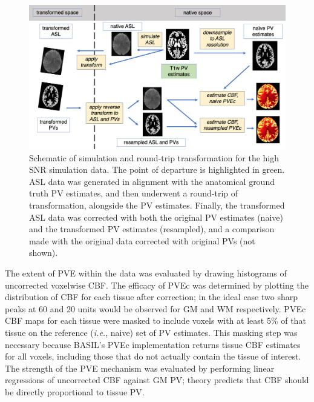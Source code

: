\documentclass[12pt]{report}
\begin{document}
\begin{figure}[h]
\centering
\includegraphics[width = \textwidth]{doublesim_schema.png}
\caption{Schematic of simulation and round-trip transformation for the high SNR simulation data. The point of departure is highlighted in green. ASL data was generated in alignment with the anatomical ground truth PV estimates, and then underwent a round-trip of transformation, alongside the PV estimates. Finally, the transformed ASL data was corrected with both the original PV estimates (naive) and the transformed PV estimates (resampled), and a comparison made with the original data corrected with original PVs (not shown).}
\label{doublesim_schema}
\end{figure}

The extent of PVE within the data was evaluated by drawing histograms of uncorrected voxelwise CBF. The efficacy of PVEc was determined by plotting the distribution of CBF for each tissue after correction; in the ideal case two sharp peaks at 60 and 20 units would be observed for GM and WM respectively. PVEc CBF maps for each tissue were masked to include voxels with at least 5\% of that tissue on the reference (\textit{i.e.}, naive) set of PV estimates. This masking step was necessary because BASIL's PVEc implementation returns tissue CBF estimates for all voxels, including those that do not actually contain the tissue of interest. The strength of the PVE mechanism was evaluated by performing linear regressions of uncorrected CBF against GM PV; theory predicts that CBF should be directly proportional to tissue PV. 
\end{document}
